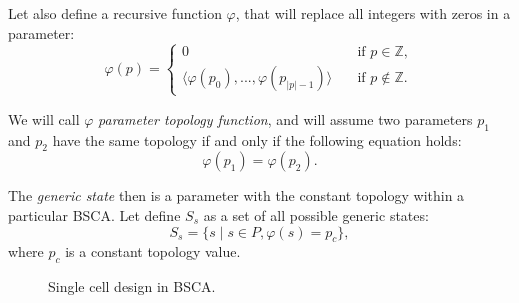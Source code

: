 \documentclass[a4paper,12pt,tikz,UTF8]{article}
\begin{document}
    Let also define a recursive function $\varphi$, that will replace all integers with zeros in a parameter:
    \begin{equation}
      \varphi(p) = 
      \begin{cases}
        0 \quad & \text{if } p \in \mathbb{Z},\\
        \langle \varphi(p_0), ..., \varphi(p_{|p|-1}) \rangle \quad & \text{if } p \notin \mathbb{Z}.
      \end{cases}
    \end{equation}

    We will call $\varphi$ \textit{parameter topology function}, and will assume two parameters $p_1$ and $p_2$ have the same topology if and only if the following equation holds:
    \begin{equation}
      \varphi(p_1) = \varphi(p_2).
    \end{equation}

    The \textit{generic state} then is a parameter with the constant topology within a particular BSCA. Let define $S_s$ as a set of all possible generic states:
    \begin{equation}
      S_s = \{ s \mid s \in P, \varphi(s) = p_c \},
    \end{equation}
    where $p_c$ is a constant topology value.

    \begin{figure}[H]
      \centering
      \caption{Single cell design in BSCA.}
      \label{fig:cell-design}
    \end{figure}
\end{document}
